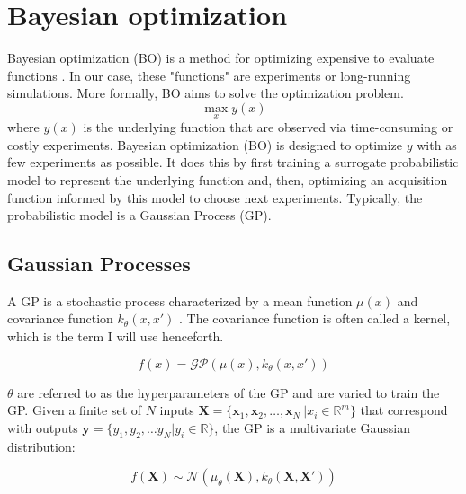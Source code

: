 \section{Bayesian optimization}

Bayesian optimization (BO) is a method for optimizing expensive to evaluate functions \cite{Shahriari2016}. In our case, these "functions" are experiments or long-running simulations. More formally, BO aims to solve the optimization problem.
\begin{equation}
    \max_x y(x)
\end{equation}
where $y(x)$ is the underlying function that are observed via time-consuming or costly experiments. Bayesian optimization (BO) is designed to optimize $y$ with as few experiments as possible. It does this by first training a surrogate probabilistic model to represent the underlying function and, then, optimizing an acquisition function informed by this model to choose next experiments. Typically, the probabilistic model is a Gaussian Process (GP). 

\subsection{Gaussian Processes}

A GP is a stochastic process characterized by a mean function $\mu(x)$ and covariance function $k_{\theta}(x,x')$ \cite{Rasmussen2006}. The covariance function is often called a kernel, which is the term I will use henceforth.

\begin{equation}
    f(x)= \mathcal{GP}(\mu(x), k_{\theta}(x, x'))
\end{equation}

$\theta$ are referred to as the hyperparameters of the GP and are varied to train the GP. Given a finite set of $N$ inputs $\mathbf X = \{\mathbf x_1, \mathbf x_2, \dots, \mathbf x_N \ \vert x_i \in \mathbb R^m \}$ that correspond with outputs $\mathbf y = \{y_1, y_2, \dots y_N \vert  y_i \in \mathbb R \}$, the GP is a multivariate Gaussian distribution:

\begin{equation}
    f(\mathbf X) \sim \mathcal N(\mu_{\theta}(\mathbf X), k_{\theta}(\mathbf X, \mathbf X'))
\end{equation}

